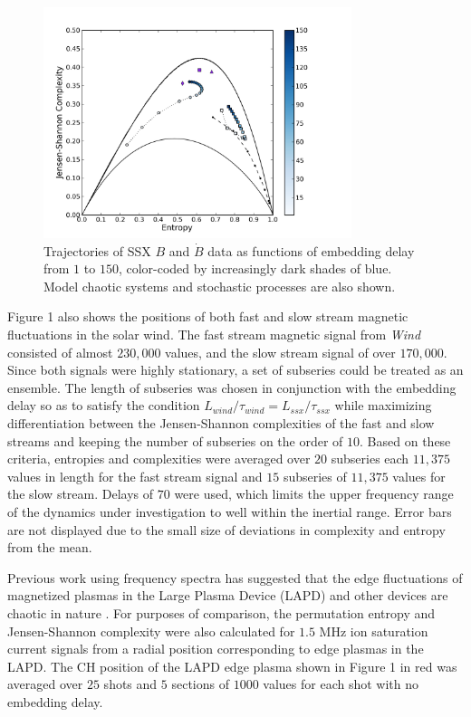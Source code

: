 \documentclass[aps,pre,twocolumn,secnumarabic,nobalancelastpage,amsmath,amssymb,
nofootinbib]{revtex4-1}
\begin{document}
\begin{figure}[!htbp]
\centerline{
\includegraphics[width=9cm]{fig3.png}}
\caption{\label{Figure 3}Trajectories of SSX $B$ and $\dot{B}$ data as functions of embedding delay from $1$ to $150$, color-coded by increasingly dark shades of blue. Model chaotic systems and stochastic processes are also shown.}
\end{figure} 

Figure 1 also shows the positions of both fast and slow stream magnetic fluctuations in the solar wind.  The fast stream magnetic signal from \textit{Wind} consisted of almost $230,000$ values, and the slow stream signal of over $170,000$. Since both signals were highly stationary, a set of subseries could be treated as an ensemble. The length of subseries was chosen in conjunction with the embedding delay so as to satisfy the condition $L_{wind}/\tau_{wind} = L_{ssx}/\tau_{ssx}$ while maximizing differentiation between the Jensen-Shannon complexities of the fast and slow streams and keeping the number of subseries on the order of $10$. Based on these criteria, entropies and complexities were averaged over $20$ subseries each $11,375$ values in length for the fast stream signal and $15$ subseries of $11,375$ values for the slow stream. Delays of $70$ were used, which limits the  upper frequency range of the dynamics under investigation to well within the inertial range. Error bars are not displayed due to the small size of deviations in complexity and entropy from the mean.

Previous work using frequency spectra has suggested that the edge fluctuations of magnetized plasmas in the Large Plasma Device (LAPD) and other devices are chaotic in nature \cite{maggs2012}. For purposes of comparison, the permutation entropy and Jensen-Shannon complexity were also calculated for $1.5$ MHz ion saturation current signals from a radial position corresponding to edge plasmas in the LAPD.  The CH position of the LAPD edge plasma shown in Figure 1 in red was averaged over $25$ shots and $5$ sections of $1000$ values for each shot with no embedding delay. 
\end{document}
